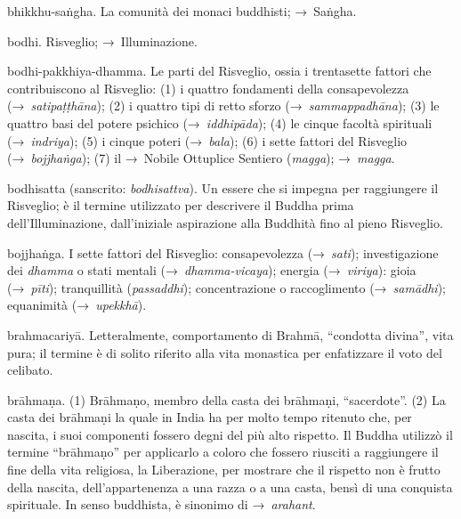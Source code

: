 \begin{glossarydescription}
\item[bhikkhu-saṅgha.] La comunità dei monaci buddhisti; →~Saṅgha.

\item[bodhi.] Risveglio; →~Illuminazione.

\item[bodhi-pakkhiya-dhamma.] Le parti del Risveglio, ossia i trentasette
  fattori che contribuiscono al Risveglio: (1) i quattro fondamenti della
  consapevolezza (→~\emph{satipaṭṭhāna}); (2) i quattro tipi di retto sforzo
  (→~\emph{sammappadhāna}); (3) le quattro basi del potere psichico
  (→~\emph{iddhipāda}); (4) le cinque facoltà spirituali (→~\emph{indriya}); (5)
  i cinque poteri (→~\emph{bala}); (6) i sette fattori del Risveglio
  (→~\emph{bojjhaṅga}); (7) il →~Nobile Ottuplice Sentiero (\emph{magga});
  →~\emph{magga}.

\item[bodhisatta] (sanscrito: \emph{bodhisattva}). Un essere che si impegna per
  raggiungere il Risveglio; è il termine utilizzato per descrivere il Buddha
  prima dell'Illuminazione, dall'iniziale aspirazione alla Buddhità fino al
  pieno Risveglio.

\item[bojjhaṅga.]\label{glossary-bojjhanga} I sette fattori del Risveglio: consapevolezza
  (→~\emph{sati}); investigazione dei \emph{dhamma} o stati mentali
  (→~\emph{dhamma-vicaya}); energia (→~\emph{viriya}): gioia (→~\emph{pīti});
  tranquillità (\emph{passaddhi}); concentrazione o raccoglimento
  (→~\emph{samādhi}); equanimità (→~\emph{upekkhā}).

\item[brahmacariyā.] Letteralmente, comportamento di Brahmā, ``condotta
  divina'', vita pura; il termine è di solito riferito alla vita monastica per
  enfatizzare il voto del celibato.

\item[brāhmaṇa.]\label{glossary-brahmana} (1) Brāhmaṇo, membro della casta dei brāhmaṇi,
  ``sacerdote''. (2) La casta dei brāhmaṇi la quale in India ha per molto tempo
  ritenuto che, per nascita, i suoi componenti fossero degni del più alto
  rispetto. Il Buddha utilizzò il termine ``brāhmaṇo'' per applicarlo a coloro
  che fossero riusciti a raggiungere il fine della vita religiosa, la
  Liberazione, per mostrare che il rispetto non è frutto della nascita,
  dell'appartenenza a una razza o a una casta, bensì di una conquista
  spirituale. In senso buddhista, è sinonimo di →~\emph{arahant}.


\end{glossarydescription}
